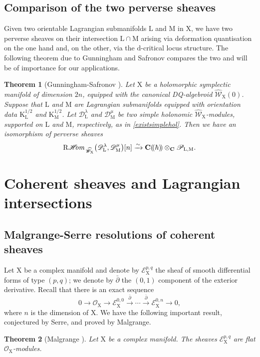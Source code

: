 \documentclass{article}
\theoremstyle{plain}
\newtheorem{theorem}{Theorem}[subsection]   %
\theoremstyle{definition}
\theoremstyle{remark}
\newcommand{\mr}{\mathrm}
\newcommand{\C}{\mathbf C}
\newcommand{\cbrak}{(\!(\hbar)\!)}
\newcommand{\3}{\vspace{3mm}}
\newcommand{\2}{\vspace{2mm}}
\newcommand{\1}{\vspace{1mm}}
\newcommand*{\shom}{\mathscr{H}\text{\kern -3pt {\it{om}}}\,}
\begin{document}
\subsection{Comparison of the two perverse sheaves}
Given two orientable Lagrangian submanifolds $\mr{L}$ and $\mr{M}$ in $\mr{X}$, we have two perverse sheaves on their intersection $\mr{L}\cap \mr{M}$ arising via deformation quantisation on the one hand and, on the other, via the $\mr{d}$-critical locus structure. The following theorem due to Gunningham and Safronov \cite{saf} compares the two and will be of importance for our applications.
\2
\begin{theorem}[Gunningham-Safronov \cite{saf}]\label{pervref}
 Let $\mr X$ be a holomorphic symplectic manifold of dimension $2n$, equipped with the canonical DQ-algebroid $\widehat{\mathscr{W}}_\mr{X}(0)$. Suppose that $\mr{L}$ and $\mr{M}$ are Lagrangian submanifolds equipped with orientation data $\mr{K}_{\mr{L}}^{1/2}$ and $\mr{K}_\mr{M}^{1/2}$. Let $\mathscr{D}^{\lambda}_{\mr{L}}$ and $\mathscr{D}^{\mu}_{\mr{M}}$ be two simple holonomic $\widehat{\mathscr{W}}_\mr{X}$-modules, supported on $\mr{L}$ and $\mr{M}$, respectively, as in \cref{existsimplehol}. Then we have an isomorphism of perverse sheaves $$\mr{R}\shom_{\widehat{\mathscr{W}}_\mr{X}}\big(\mathscr{D}^{\lambda}_{\mr{L}},\mathscr{D}^{\mu}_{\mr{M}}\big)[n] \xrightarrow{\sim} \C\cbrak \otimes_{\C} \mathscr{P}_{\mr{L,M}}.$$
\end{theorem}

\section{Coherent sheaves and Lagrangian intersections}\label{sec3}

\subsection{Malgrange-Serre resolutions of coherent sheaves}\label{msres}

Let $\mr{X}$ be a complex manifold and denote by $\mathscr{E}_\mr{X}^{p,q}$ the sheaf of smooth differential forms of type $(p,q)$; we denote by $\bar{\partial}$ the $(0,1)$ component of the exterior derivative. Recall that there is an exact sequence $$0 \to \mathscr{O}_\mr{X} \to \mathscr{E}_\mr{X}^{0,0} \xrightarrow{\bar{\partial}} \cdots \xrightarrow{\bar{\partial}} \mathscr{E}_\mr{X}^{0,n}\to 0,$$ where $n$ is the dimension of $\mr{X}$. We have the following important result, conjectured by Serre, and proved by Malgrange.
\2
\begin{theorem}[Malgrange \cite{Malgrange1962-1964}]
Let $\mr{X}$ be a complex manifold. The sheaves $\mathscr{E}_\mr{X}^{p,q}$ are flat $\mathscr{O}_\mr{X}$-modules.
\end{theorem}
\end{document}
